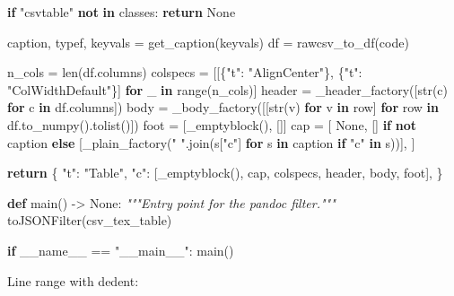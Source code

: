 \documentclass[
]{article}
\newenvironment{Shaded}{}{}
\newcommand{\BuiltInTok}[1]{\textcolor[rgb]{0.00,0.50,0.00}{#1}}
\newcommand{\CommentTok}[1]{\textcolor[rgb]{0.38,0.63,0.69}{\textit{#1}}}
\newcommand{\ControlFlowTok}[1]{\textcolor[rgb]{0.00,0.44,0.13}{\textbf{#1}}}
\newcommand{\KeywordTok}[1]{\textcolor[rgb]{0.00,0.44,0.13}{\textbf{#1}}}
\newcommand{\NormalTok}[1]{#1}
\newcommand{\OperatorTok}[1]{\textcolor[rgb]{0.40,0.40,0.40}{#1}}
\newcommand{\StringTok}[1]{\textcolor[rgb]{0.25,0.44,0.63}{#1}}
\newcommand{\VariableTok}[1]{\textcolor[rgb]{0.10,0.09,0.49}{#1}}
\begin{document}
\begin{Shaded}
\begin{Highlighting}[]
    \ControlFlowTok{if} \StringTok{"csvtable"} \KeywordTok{not} \KeywordTok{in}\NormalTok{ classes:}
        \ControlFlowTok{return} \VariableTok{None}

\NormalTok{    caption, typef, keyvals }\OperatorTok{=}\NormalTok{ get\_caption(keyvals)}
\NormalTok{    df }\OperatorTok{=}\NormalTok{ rawcsv\_to\_df(code)}

\NormalTok{    n\_cols }\OperatorTok{=} \BuiltInTok{len}\NormalTok{(df.columns)}
\NormalTok{    colspecs }\OperatorTok{=}\NormalTok{ [[\{}\StringTok{"t"}\NormalTok{: }\StringTok{"AlignCenter"}\NormalTok{\}, \{}\StringTok{"t"}\NormalTok{: }\StringTok{"ColWidthDefault"}\NormalTok{\}] }\ControlFlowTok{for}\NormalTok{ \_ }\KeywordTok{in} \BuiltInTok{range}\NormalTok{(n\_cols)]}
\NormalTok{    header }\OperatorTok{=}\NormalTok{ \_header\_factory([}\BuiltInTok{str}\NormalTok{(c) }\ControlFlowTok{for}\NormalTok{ c }\KeywordTok{in}\NormalTok{ df.columns])}
\NormalTok{    body }\OperatorTok{=}\NormalTok{ \_body\_factory([[}\BuiltInTok{str}\NormalTok{(v) }\ControlFlowTok{for}\NormalTok{ v }\KeywordTok{in}\NormalTok{ row] }\ControlFlowTok{for}\NormalTok{ row }\KeywordTok{in}\NormalTok{ df.to\_numpy().tolist()])}
\NormalTok{    foot }\OperatorTok{=}\NormalTok{ [\_emptyblock(), []]}
\NormalTok{    cap }\OperatorTok{=}\NormalTok{ [}
        \VariableTok{None}\NormalTok{,}
\NormalTok{        []}
        \ControlFlowTok{if} \KeywordTok{not}\NormalTok{ caption}
        \ControlFlowTok{else}\NormalTok{ [\_plain\_factory(}\StringTok{" "}\NormalTok{.join(s[}\StringTok{"c"}\NormalTok{] }\ControlFlowTok{for}\NormalTok{ s }\KeywordTok{in}\NormalTok{ caption }\ControlFlowTok{if} \StringTok{"c"} \KeywordTok{in}\NormalTok{ s))],}
\NormalTok{    ]}

    \ControlFlowTok{return}\NormalTok{ \{}
        \StringTok{"t"}\NormalTok{: }\StringTok{"Table"}\NormalTok{,}
        \StringTok{"c"}\NormalTok{: [\_emptyblock(), cap, colspecs, header, body, foot],}
\NormalTok{    \}}


\KeywordTok{def}\NormalTok{ main() }\OperatorTok{{-}\textgreater{}} \VariableTok{None}\NormalTok{:}
    \CommentTok{"""Entry point for the pandoc filter."""}
\NormalTok{    toJSONFilter(csv\_tex\_table)}


\ControlFlowTok{if} \VariableTok{\_\_name\_\_} \OperatorTok{==} \StringTok{"\_\_main\_\_"}\NormalTok{:}
\NormalTok{    main()}
\end{Highlighting}
\end{Shaded}

Line range with dedent:
\end{document}
